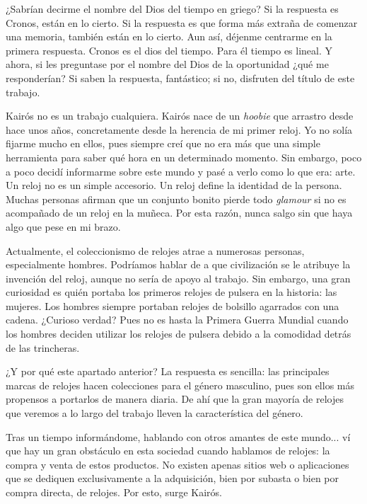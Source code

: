 
¿Sabrían decirme el nombre del Dios del tiempo en griego? Si la respuesta es Cronos, están en lo cierto. Si la respuesta es que forma más extraña de comenzar una memoria, también están en lo cierto. Aun así, déjenme centrarme en la primera respuesta. Cronos es el dios del tiempo. Para él tiempo es lineal. Y ahora, si les preguntase por el nombre del Dios de la oportunidad ¿qué me responderían? Si saben la respuesta, fantástico; si no, disfruten del título de este trabajo.

Kairós no es un trabajo cualquiera. Kairós nace de un \emph{hoobie} que arrastro desde hace unos años, concretamente desde la herencia de mi primer reloj. Yo no solía fijarme mucho en ellos, pues siempre creí que no era más que una simple herramienta para saber qué hora en un determinado momento. Sin embargo, poco a poco decidí informarme sobre este mundo y pasé a verlo como lo que era: arte. Un reloj no es un simple accesorio. Un reloj define la identidad de la persona. Muchas personas afirman que un conjunto bonito pierde todo \emph{glamour} si no es acompañado de un reloj en la muñeca. Por esta razón, nunca salgo sin que haya algo que pese en mi brazo.

Actualmente, el coleccionismo de relojes atrae a numerosas personas, especialmente hombres. Podríamos hablar de a que civilización se le atribuye la invención del reloj, aunque no sería de apoyo al trabajo. Sin embargo, una gran curiosidad es quién portaba los primeros relojes de pulsera en la historia: las mujeres. Los hombres siempre portaban relojes de bolsillo agarrados con una cadena. ¿Curioso verdad? Pues no es hasta la Primera Guerra Mundial cuando los hombres deciden utilizar los relojes de pulsera debido a la comodidad detrás de las trincheras.

¿Y por qué este apartado anterior? La respuesta es sencilla: las principales marcas de relojes hacen colecciones para el género masculino, pues son ellos más propensos a portarlos de manera diaria. De ahí que la gran mayoría de relojes que veremos a lo largo del trabajo lleven la característica del género.

Tras un tiempo informándome, hablando con otros amantes de este mundo... ví que hay un gran obstáculo en esta sociedad cuando hablamos de relojes: la compra y venta de estos productos. No existen apenas sitios web o aplicaciones que se dediquen exclusivamente a la adquisición, bien por subasta o bien por compra directa, de relojes. Por esto, surge Kairós.

